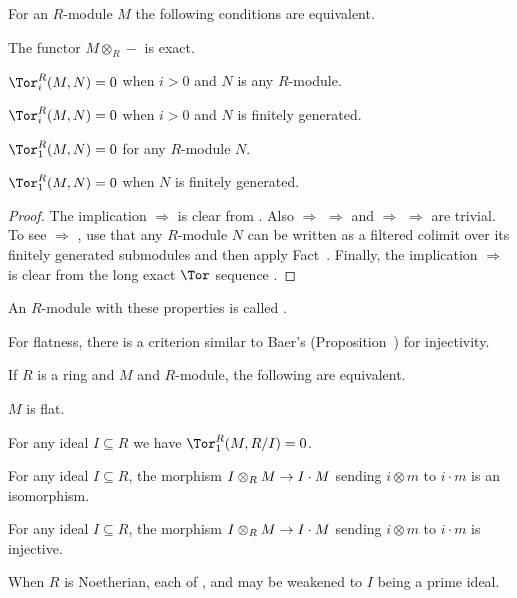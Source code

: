 \documentclass[a4paper,parskip=half,numbers=enddot, DIV=12]{scrreprt}
\begin{document}
\begin{prop}
	For an $R$-module $M$ the following conditions are equivalent.
	\begin{alphanumerate}
		\item The functor $M\otimes _R-$ is exact.
		\item $\Tor_i^R(M,N)=0$ when $i>0$ and $N$ is any $R$-module.
		\item $\Tor_i^R(M,N)=0$ when $i>0$ and $N$ is finitely generated.
		\item $\Tor_1^R(M,N)=0$ for any $R$-module $N$.
		\item $\Tor_1^R(M,N)=0$ when $N$ is finitely generated.
	\end{alphanumerate}
\end{prop}
\begin{proof}
	The implication  $\Rightarrow$  is clear from . Also  $\Rightarrow$  $\Rightarrow$  and  $\Rightarrow$  $\Rightarrow$  are trivial. To see  $\Rightarrow$ , use that any $R$-module $N$ can be written as a filtered colimit over its finitely generated submodules and then apply Fact~. Finally, the implication  $\Rightarrow$  is clear from the long exact $\Tor$ sequence . 
\end{proof}
\begin{defi}
	An $R$-module with these properties is called .
\end{defi}
For flatness, there is a criterion similar to Baer's (Proposition~) for injectivity.
\begin{prop}
	If $R$ is a ring and $M$ and $R$-module, the following are equivalent.
	\begin{alphanumerate}
		\item $M$ is flat.
		\item For any ideal $I\subseteq R$ we have $\Tor_1^R(M,R/I)=0$.
		\item For any ideal $I\subseteq R$, the morphism $I\otimes_RM\morphism I\cdot M$ sending $i\otimes m$ to $i\cdot m$ is an isomorphism.
		\item For any ideal $I\subseteq R$, the morphism $I\otimes_RM\morphism I\cdot M$ sending $i\otimes m$ to $i\cdot m$ is injective.
	\end{alphanumerate}
	When $R$ is Noetherian, each of ,  and  may be weakened to $I$ being a prime ideal.
\end{prop}
\end{document}
